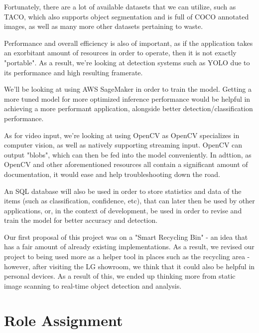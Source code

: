 \documentclass[conference]{IEEEtran}
\begin{document}
Fortunately, there are a lot of available datasets that we can utilize, such as TACO, which also supports object segmentation and is full of COCO annotated images, as well as many more other datasets pertaining to waste.

Performance and overall efficiency is also of important, as if the application takes an exorbitant amount of resources in order to operate, then it is not exactly "portable". As a result, we're looking at detection systems such as YOLO due to its performance and high resulting framerate.

We'll be looking at using AWS SageMaker in order to train the model. Getting a more tuned model for more optimized inference performance would be helpful in achieving a more performant application, alongside better detection/classification performance.

As for video input, we're looking at using OpenCV as OpenCV specializes in computer vision, as well as natively supporting streaming input. OpenCV can output "blobs", which can then be fed into the model conveniently. In adttion, as OpenCV and other aforementioned  resources all contain a significant amount of documentation, it would ease and help troubleshooting down the road.

An SQL database will also be used in order to store statistics and data of the items (such as classification, confidence, etc), that can later then be used by other applications, or, in the context of development, be used in order to revise and train the model for better accuracy and detection.

Our first proposal of this project was on a "Smart Recycling Bin" - an idea that has a fair amount of already existing implementations. As a result, we revised our project to being used more as a helper tool in places such as the recycling area - however, after visiting the LG showroom, we think that it could also be helpful in personal devices. As a result of this, we ended up thinking more from static image scanning to real-time object detection and analysis.

\newpage

\section{Role Assignment}
\end{document}
